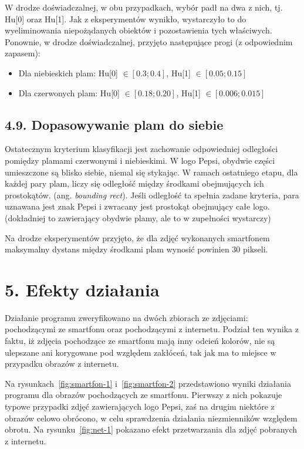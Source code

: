\documentclass[11pt,a4paper,twoside]{report}
\begin{document}
			W drodze doświadczalnej, w obu przypadkach, wybór padł na dwa z nich, tj. Hu[0] oraz Hu[1]. Jak z eksperymentów wynikło, wystarczyło to do wyeliminowania niepożądanych obiektów i pozostawienia tych właściwych. Ponownie, w drodze doświadczalnej, przyjęto następujące progi (z odpowiednim zapasem):

			\begin{itemize}
				\item Dla niebieskich plam: Hu[0] $\in [0.3; 0.4]$, Hu[1] $\in [0.05; 0.15]$
				\item Dla czerwonych plam: Hu[0] $\in [0.18; 0.20]$, Hu[1] $\in [0.006; 0.015]$
			\end{itemize}

	\subsection*{4.9. Dopasowywanie plam do siebie}

			Ostatecznym kryterium klasyfikacji jest zachowanie odpowiedniej odległości pomiędzy plamami czerwonymi i niebieskimi. W logo Pepsi, obydwie części umieszczone są blisko siebie, niemal się stykając. W ramach ostatniego etapu, dla każdej pary plam, liczy się odległość między środkami obejmujących ich prostokątów. (ang. \emph{bounding rect}). Jeśli odległość ta spełnia zadane kryteria, para uznawana jest znak Pepsi i zwracany jest prostokąt obejmujący całe logo. (dokładniej to zawierający obydwie plamy, ale to w zupełności wystarczy)

			Na drodze eksperymentów przyjęto, że dla zdjęć wykonanych smartfonem maksymalny dystans między środkami plam wynosić powinien 30 pikseli.

\section*{5. Efekty działania}

	Działanie programu zweryfikowano na dwóch zbiorach ze zdjęciami: pochodzącymi ze smartfonu oraz pochodzącymi z internetu. Podział ten wynika z faktu, iż zdjęcia pochodzące ze smartfonu mają inny odcień kolorów, nie są ulepszane ani korygowane pod względem zakłóceń, tak jak ma to miejsce w przypadku obrazów z internetu.

	Na rysunkach~\ref{fig:smartfon-1} i~\ref{fig:smartfon-2} przedstawiono wyniki działania programu dla obrazów pochodzących ze smartfonu. Pierwszy z nich pokazuje typowe przypadki zdjęć zawierających logo Pepsi, zaś na drugim niektóre z obrazów celowo obrócono, w celu sprawdzenia działania niezmienników względem obrotu. Na rysunku~\ref{fig:net-1} pokazano efekt przetwarzania dla zdjęć pobranych z internetu.
\end{document}
